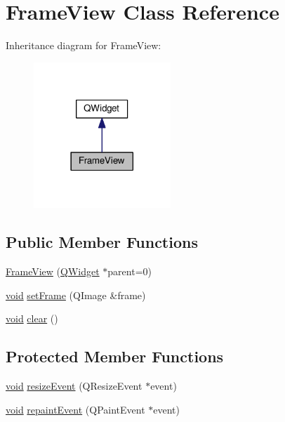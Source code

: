 \hypertarget{classGUI_1_1FrameView}{}\section{Frame\+View Class Reference}
\label{classGUI_1_1FrameView}


Inheritance diagram for Frame\+View\+:
\nopagebreak
\begin{figure}[H]
\begin{center}
\leavevmode
\includegraphics[width=146pt]{classGUI_1_1FrameView__inherit__graph}
\end{center}
\end{figure}
\subsection*{Public Member Functions}
\begin{DoxyCompactItemize}
\item 
\hyperlink{classGUI_1_1FrameView_a75ab7862211fa66433f92fc148ba9e7d}{Frame\+View} (\hyperlink{classGUI_1_1QWidget}{Q\+Widget} $\ast$parent=0)
\item 
\hyperlink{classGUI_1_1FrameView_a3d5c8743a83d04c10c6686dbb2698088}{void} \hyperlink{classGUI_1_1FrameView_ab38693f5302565670675156a8f33d77c}{set\+Frame} (Q\+Image \&frame)
\item 
\hyperlink{classGUI_1_1FrameView_a3d5c8743a83d04c10c6686dbb2698088}{void} \hyperlink{classGUI_1_1FrameView_ac8bb3912a3ce86b15842e79d0b421204}{clear} ()
\end{DoxyCompactItemize}
\subsection*{Protected Member Functions}
\begin{DoxyCompactItemize}
\item 
\hyperlink{classGUI_1_1FrameView_a3d5c8743a83d04c10c6686dbb2698088}{void} \hyperlink{classGUI_1_1FrameView_a6fbc07cec19868c41d513b9ef8343e9a}{resize\+Event} (Q\+Resize\+Event $\ast$event)
\item 
\hyperlink{classGUI_1_1FrameView_a3d5c8743a83d04c10c6686dbb2698088}{void} \hyperlink{classGUI_1_1FrameView_a67e5a053c3728683d415a35d1eafa5c2}{repaint\+Event} (Q\+Paint\+Event $\ast$event)
\end{DoxyCompactItemize}

